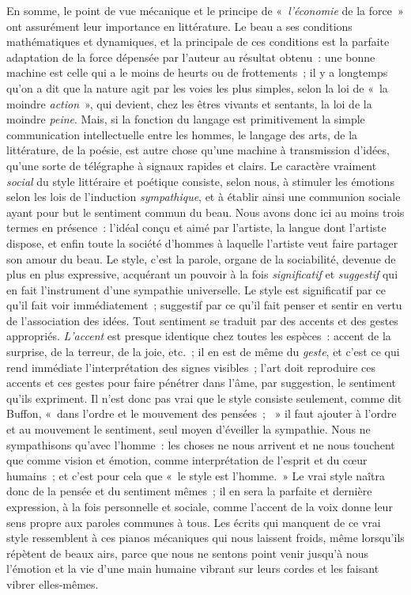 \documentclass[french,twoside]{book} %
\begin{document}
En somme, le point de vue mécanique et le principe de « \emph{l’économie} de la force » ont assurément leur importance en littérature. Le beau a ses conditions mathématiques et dynamiques, et la principale de ces conditions est la parfaite adaptation de la force dépensée par l’auteur au résultat obtenu : une bonne machine est celle qui a le moins de heurts ou de frottements ; il y a longtemps qu’on a dit que la nature agit par les voies les plus simples, selon la loi de « la moindre \emph{action} », qui devient, chez les êtres vivants et sentants, la loi de la moindre \emph{peine}. Mais, si la fonction du langage est primitivement la simple communication intellectuelle entre les hommes, le langage des arts, de la littérature, de la poésie, est autre chose qu’une machine à transmission d’idées, qu’une sorte de télégraphe à signaux rapides et clairs. Le caractère vraiment \emph{social} du style littéraire et poétique consiste, selon nous, à stimuler les émotions selon les lois de l’induction \emph{sympathique}, et à établir ainsi une communion sociale ayant pour but le sentiment commun du beau. Nous avons donc ici au moins trois termes en présence : l’idéal conçu et aimé par l’artiste, la langue dont l’artiste dispose, et enfin toute la société d’hommes à laquelle l’artiste veut faire partager son amour du beau. Le style, c’est la parole, organe de la sociabilité, devenue de plus en plus expressive, acquérant un pouvoir à la fois \emph{significatif} et \emph{suggestif} qui en fait l’instrument d’une sympathie universelle. Le style est significatif par ce qu’il fait voir immédiatement ; suggestif par ce qu’il fait penser et sentir en vertu de l’association des idées. Tout sentiment se traduit par des accents et des gestes appropriés. \emph{L’accent} est presque identique chez toutes les espèces : accent de la surprise, de la terreur, de la joie, etc. ; il en est de même du \emph{geste}, et c’est ce qui rend immédiate l’interprétation des signes visibles ; l’art doit reproduire ces accents et ces gestes pour faire pénétrer dans l’âme, par suggestion, le sentiment qu’ils expriment. Il n’est donc pas vrai que le style consiste seulement, comme dit Buffon, « dans l’ordre et le mouvement des pensées ;  » il faut ajouter à l’ordre et au mouvement le sentiment, seul moyen d’éveiller la sympathie. Nous ne sympathisons qu’avec l’homme : les choses ne nous arrivent et ne nous touchent que comme vision et émotion, comme interprétation de l’esprit et du cœur humains ; et c’est pour cela que « le style est l’homme. » Le vrai style naîtra donc de la pensée et du sentiment mêmes ; il en sera la parfaite et dernière expression, à la fois personnelle et sociale, comme l’accent de la voix donne leur sens propre aux paroles communes à tous. Les écrits qui manquent de ce vrai style ressemblent à ces pianos mécaniques qui nous laissent froids, même lorsqu’ils répètent de beaux airs, parce que nous ne sentons point venir jusqu’à nous l’émotion et la vie d’une main humaine vibrant sur leurs cordes et les faisant vibrer elles-mêmes.\par
\end{document}
